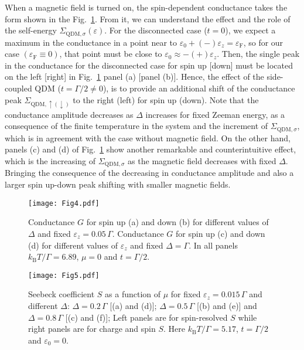 \documentclass[aps,twocolumn,prb,superscript,floatfix,superscriptaddress,showpacs]{revtex4-1}
\newcommand{\ve}{\varepsilon}
\begin{document}
When a magnetic field is turned on, the spin-dependent conductance takes the form shown in the Fig.\ \ref{Fig4}. From it, we can understand the effect and the role of the self-energy $\Sigma_{\text{QDM},\sigma}(\ve)$. For the disconnected case ($t=0$), we expect a maximum in the conductance in a point near to $\ve_{0}+(-)\ve_{z}= \ve_{\text{F}}$, so for our case $(\ve_{\text{F}}\equiv 0)$, that point must be close to $\ve_{0}\approx -(+)\ve_{z}$. Then, the single peak in the conductance for the disconnected case for spin up [down] must be located on the left [right] in Fig.\ \ref{Fig4} panel (a) [panel (b)]. Hence, the effect of the side-coupled QDM ($t=\Gamma/2\neq 0$), is to provide an additional shift of the conductance peak $\Sigma_{\text{QDM},\uparrow(\downarrow)}$ to the right (left) for spin up (down). Note that the conductance amplitude decreases as $\Delta$ increases for fixed Zeeman energy,  as a consequence of the finite temperature in the system and the increment of $\Sigma_{\text{QDM},\sigma}$, which is in agreement with the case without magnetic field. On the other hand, panels (c) and (d) of Fig.\ \ref{Fig4} show another remarkable and counterintuitive effect, which is the increasing of $\Sigma_{\text{QDM},\sigma}$ as the magnetic field decreases with fixed $\Delta$. Bringing the consequence of the decreasing in conductance amplitude and also a larger spin up-down peak shifting with smaller magnetic fields. 

\begin{figure}[tbph]
\centering
\texttt{[image: Fig4.pdf]}
\caption{Conductance $G$ for spin up (a) and down (b) for different values of $\Delta$ and fixed $\ve_{z}=0.05\,\Gamma$. Conductance $G$ for spin up (c) and down (d) for different values of $\ve_{z}$ and fixed $\Delta=\Gamma$. In all panels $k_{\text{B}}T/\Gamma=6.89$, $\mu=0$ and $t=\Gamma/2$.}
\label{Fig4}
\end{figure}

\begin{figure}[tbph]
\centering
\texttt{[image: Fig5.pdf]}
\caption{Seebeck coefficient $S$ as a function of $\mu$ for fixed $\ve_{z}=0.015\,\Gamma$ and different $\Delta$: $\Delta=0.2\,\Gamma$ [(a) and (d)]; $\Delta=0.5\,\Gamma$ [(b) and (e)] and $\Delta=0.8\,\Gamma$ [(c) and (f)]; Left panels are for spin-resolved $S$ while right panels are for charge and spin $S$. Here $k_{\text{B}}T/\Gamma=5.17$, $t=\Gamma/2$ and $\ve_{0}=0$.}\label{Fig5}
\end{figure}
\end{document}

